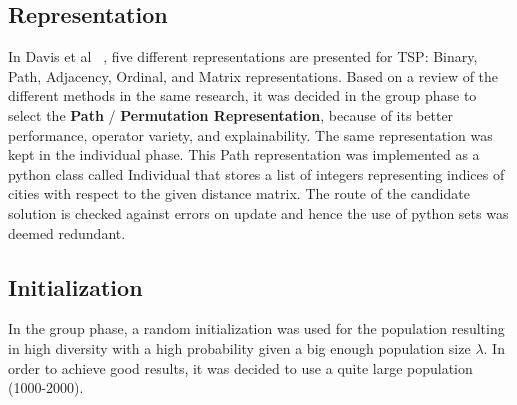 \documentclass[a4paper,10pt]{article}
\newcommand{\ReplaceMe}[1]{{\color{blue}#1}}
\begin{document}

\subsection{Representation} \label{ss:representation}


In Davis et al ~\cite{davis}, five different representations are presented for TSP: Binary, Path, Adjacency, Ordinal, and Matrix representations. Based on a review of the different methods in the same research, it was decided in the group phase to select the \textbf{Path} / \textbf{Permutation Representation}, because of its better performance, operator variety, and explainability. The same representation was kept in the individual phase. This  Path representation was implemented as a python class called Individual that stores a list of integers representing indices of cities with respect to the given distance matrix. The route of the candidate solution is checked against errors on update and hence the use of python sets was deemed redundant.

\subsection{Initialization} \label{ss:initialization}


In the group phase, a random initialization was used for the population resulting in high diversity with a high probability given a big enough population size $\lambda$. In order to achieve good results, it was decided to use a quite large population (1000-2000).
\end{document}
